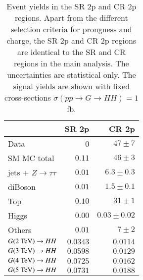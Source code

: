    \begin{table}[htbp]
        \caption{Event yields in the SR 2p and CR 2p regions. 
        Apart from the different selection criteria for prongness and charge, the SR 2p and CR 2p regions are identical to the SR and CR regions in the main analysis.
        The uncertainties are statistical only. 
        The signal yields are shown with fixed cross-sections $\sigma(pp\rightarrow G\rightarrow HH) = 1$ fb.}
        \label{tab:n_evt_2p}
        \centering
        \begin{tabular}{lrr}
            \toprule
                                                    & SR 2p                                   & CR 2p             \\
            \midrule
            Data                                    & 0                                       & $47 \pm 7$        \\
            SM MC total                             & $0.11$                                  & $46 \pm 3$        \\
            \midrule         
            jets + $Z\rightarrow\tau\tau$           & $0.01$                                  & $6.3  \pm 0.3$     \\
            diBoson                                 & $0.01$                                  & $1.5  \pm 0.1$     \\
            Top                                     & $0.10$                                  & $31   \pm 1$        \\
            Higgs                                   & $0.00$                                  & $0.03 \pm 0.02$   \\
            Others                                  & $0.01$                                  & $7    \pm 2$         \\
            \midrule         
            $G(2~\text{TeV})\rightarrow HH$               & $0.0343$                                & $0.0114 $         \\
            $G(3~\text{TeV})\rightarrow HH$               & $0.0598$                                & $0.0129 $         \\
            $G(4~\text{TeV})\rightarrow HH$               & $0.0725$                                & $0.0162 $         \\
            $G(5~\text{TeV})\rightarrow HH$               & $0.0731$                                & $0.0188 $         \\
            \bottomrule
        \end{tabular}
    \end{table}

